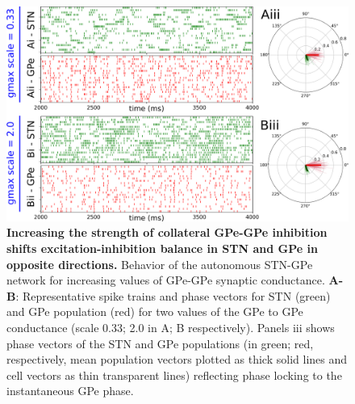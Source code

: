 \begin{figure}
\centering
\includegraphics[width=\textwidth]{ch_detailed_model/figs_split/fig_endogenous_sweep-gmax-gpe-gpe_B-rasters.png}
\caption{
\textbf{Increasing the strength of collateral GPe-GPe inhibition shifts excitation-inhibition balance in STN and GPe in opposite directions.}
Behavior of the autonomous STN-GPe network for increasing values of GPe-GPe synaptic conductance.
\textbf{A-B}: Representative spike trains and phase vectors for STN (green) and GPe population (red) for two values of the GPe to GPe conductance (scale 0.33; 2.0 in A; B respectively). Panels iii shows phase vectors of the STN and GPe populations (in green; red, respectively, mean population vectors plotted as thick solid lines and cell vectors as thin transparent lines) reflecting phase locking to the instantaneous GPe phase.
}
\label{fig:endogenous_sweep-gmax-gpe-gpe_B-rasters-vectors}
\end{figure}

